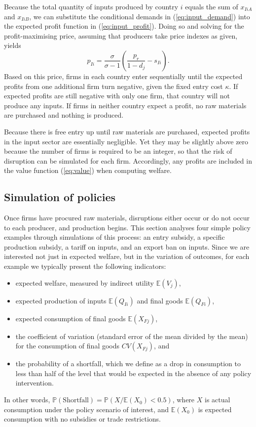 \documentclass{article}
\begin{document}
Because the total quantity of inputs produced by country $i$ equals the sum of $x_{IiA}$ and $x_{IiB}$, we can substitute the conditional demands in (\ref{eq:input_demand}) into the expected profit function in (\ref{eq:input_profit}). Doing so and solving for the profit-maximising price, assuming that producers take price indexes as given, yields
\begin{equation}
    p_{Ii} = \frac{\sigma}{\sigma - 1} \left( \frac{p_r}{1 - d_j} - s_{Ii} \right) .
\end{equation}
Based on this price, firms in each country enter sequentially until the expected profits from one additional firm turn negative, given the fixed entry cost $\kappa$. If expected profits are still negative with only one firm, that country will not produce any inputs. If firms in neither country expect a profit, no raw materials are purchased and nothing is produced.

Because there is free entry up until raw materials are purchased, expected profits in the input sector are essentially negligible. Yet they may be slightly above zero because the number of firms is required to be an integer, so that the risk of disruption can be simulated for each firm. Accordingly, any profits are included in the value function (\ref{eq:value}) when computing welfare.

\subsection{Simulation of policies}

Once firms have procured raw materials, disruptions either occur or do not occur to each producer, and production begins. This section analyses four simple policy examples through simulations of this process: an entry subsidy, a specific production subsidy, a tariff on inputs, and an export ban on inputs. Since we are interested not just in expected welfare, but in the variation of outcomes, for each example we typically present the following indicators:
\begin{itemize}
    \item expected welfare, measured by indirect utility $\mathbb{E} (V_j)$, 
    \item expected production of inputs $\mathbb{E} (Q_{Ii})$ and final goods $\mathbb{E} (Q_{Fi})$, 
    \item expected consumption of final goods $\mathbb{E} (X_{Fj})$, 
    \item the coefficient of variation (standard error of the mean divided by the mean) for the consumption of final goods $CV (X_{Fj})$, and
    \item the probability of a shortfall, which we define as a drop in consumption to less than half of the level that would be expected in the absence of any policy intervention.
\end{itemize}
In other words, $\mathbb{P}(\text{Shortfall}) = \mathbb{P} (X / \mathbb{E}(X_0) < 0.5)$, where $X$ is actual consumption under the policy scenario of interest, and $\mathbb{E} (X_0)$ is expected consumption with no subsidies or trade restrictions.
\end{document}
